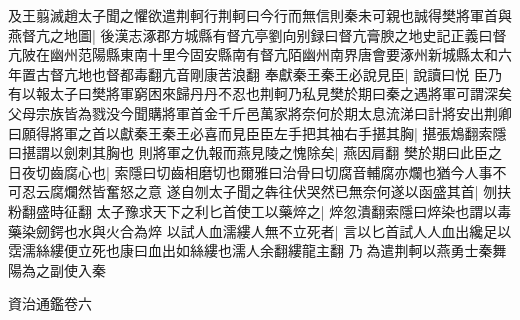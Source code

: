 及王翦滅趙太子聞之懼欲遣荆軻行荆軻曰今行而無信則秦未可親也誠得樊將軍首與燕督亢之地圖|{
	後漢志涿郡方城縣有督亢亭劉向别録曰督亢膏腴之地史記正義曰督亢陂在幽州范陽縣東南十里今固安縣南有督亢陌幽州南界唐會要涿州新城縣太和六年置古督亢地也督都毒翻亢音剛康苦浪翻}
奉獻秦王秦王必說見臣|{
	說讀曰悦}
臣乃有以報太子曰樊將軍窮困來歸丹丹不忍也荆軻乃私見樊於期曰秦之遇將軍可謂深矣父母宗族皆為戮没今聞購將軍首金千斤邑萬家將奈何於期太息流涕曰計將安出荆卿曰願得將軍之首以獻秦王秦王必喜而見臣臣左手把其袖右手揕其胸|{
	揕張鴆翻索隱曰揕謂以劍刺其胸也}
則將軍之仇報而燕見陵之愧除矣|{
	燕因肩翻}
樊於期曰此臣之日夜切齒腐心也|{
	索隱曰切齒相磨切也爾雅曰治骨曰切腐音輔腐亦爛也猶今人事不可忍云腐爛然皆奮怒之意}
遂自刎太子聞之犇往伏哭然已無奈何遂以函盛其首|{
	刎扶粉翻盛時征翻}
太子豫求天下之利匕首使工以藥焠之|{
	焠忽潰翻索隱曰焠染也謂以毒藥染劒鍔也水與火合為焠}
以試人血濡縷人無不立死者|{
	言以匕首試人人血出纔足以霑濡絲縷便立死也康曰血出如絲縷也濡人余翻縷龍主翻}
乃為遣荆軻以燕勇士秦舞陽為之副使入秦

資治通鑑卷六
